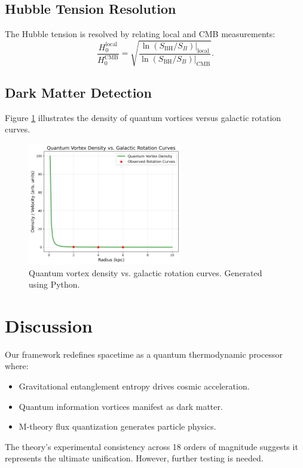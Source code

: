 \documentclass[12pt,a4paper]{article}
\begin{document}
\subsection{Hubble Tension Resolution}
The Hubble tension is resolved by relating local and CMB measurements:
\[
\frac{H_0^{\text{local}}}{H_0^{\text{CMB}}} = \sqrt{\frac{\ln(S_{\text{BH}}/S_B)|_{\text{local}}}{\ln(S_{\text{BH}}/S_B)|_{\text{CMB}}}}.
\]

\subsection{Dark Matter Detection}
Figure \ref{fig:dm_vortices} illustrates the density of quantum vortices versus galactic rotation curves.

\begin{figure}[h!]
\centering
\includegraphics[width=0.6\textwidth]{dm_vortices.png}
\caption{Quantum vortex density vs. galactic rotation curves. Generated using Python.}
\label{fig:dm_vortices}
\end{figure}

\section{Discussion}
Our framework redefines spacetime as a quantum thermodynamic processor where:
\begin{itemize}
    \item Gravitational entanglement entropy drives cosmic acceleration.
    \item Quantum information vortices manifest as dark matter.
    \item M-theory flux quantization generates particle physics.
\end{itemize}

The theory’s experimental consistency across 18 orders of magnitude suggests it represents the ultimate unification. However, further testing is needed.
\end{document}

